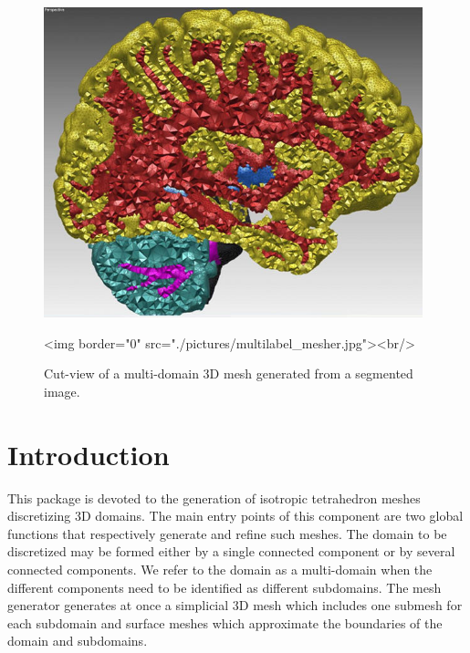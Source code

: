 \begin{figure}[ht]
\begin{center}
 \begin{ccTexOnly}
   \includegraphics[height=9cm]{Mesh_3/pictures/multilabel_mesher}
 \end{ccTexOnly}
 \begin{ccHtmlOnly}
   <img border="0" src="./pictures/multilabel_mesher.jpg"><br/>
 \end{ccHtmlOnly}
 \caption{Cut-view of a multi-domain 3D mesh generated from a segmented image.}
  \label{figure:multilabel_mesher}
\end{center}
\end{figure}

\section{Introduction}
\label{Mesh_3_section_intro}

This package is devoted to the generation of  isotropic tetrahedron
meshes discretizing 3D domains. The main entry points of this component are
two global  functions that respectively generate
and refine such meshes.
The domain to be discretized may be
formed either by a single connected component
or by several
connected components. We refer to the domain as a multi-domain
when the different components need to be
 identified  as different subdomains.
The mesh generator generates at once a simplicial 
3D mesh which includes one submesh for each subdomain
and surface meshes which approximate the boundaries 
 of the domain and subdomains.


